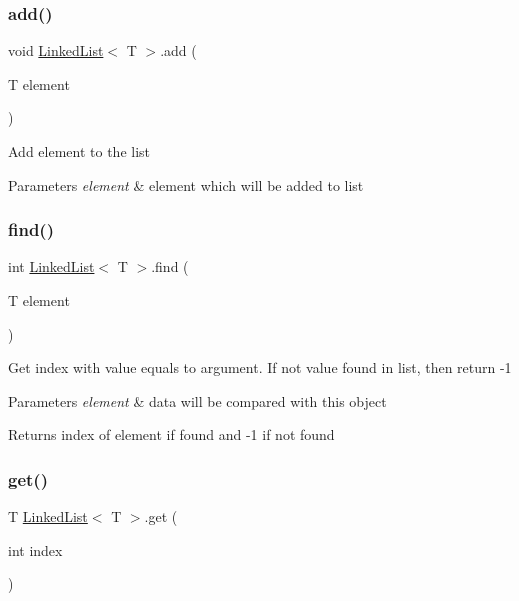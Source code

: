 \subsubsection{\texorpdfstring{add()}{add()}}
{\footnotesize\ttfamily void \mbox{\hyperlink{class_linked_list}{Linked\+List}}$<$ T $>$.add (\begin{DoxyParamCaption}\item[{T}]{element }\end{DoxyParamCaption})\hspace{0.3cm}{\ttfamily [inline]}}

Add element to the list 
\begin{DoxyParams}{Parameters}
{\em element} & element which will be added to list \\
\hline
\end{DoxyParams}
\mbox{\label{class_linked_list_abb5fc485a297b815daf6034f1c455979}} 
\subsubsection{\texorpdfstring{find()}{find()}}
{\footnotesize\ttfamily int \mbox{\hyperlink{class_linked_list}{Linked\+List}}$<$ T $>$.find (\begin{DoxyParamCaption}\item[{T}]{element }\end{DoxyParamCaption})\hspace{0.3cm}{\ttfamily [inline]}}

Get index with value equals to argument. If not value found in list, then return -\/1 
\begin{DoxyParams}{Parameters}
{\em element} & data will be compared with this object \\
\hline
\end{DoxyParams}
\begin{DoxyReturn}{Returns}
index of element if found and -\/1 if not found 
\end{DoxyReturn}
\mbox{\label{class_linked_list_a032ef46fc54f12525746d9f7c3a80663}} 
\subsubsection{\texorpdfstring{get()}{get()}}
{\footnotesize\ttfamily T \mbox{\hyperlink{class_linked_list}{Linked\+List}}$<$ T $>$.get (\begin{DoxyParamCaption}\item[{int}]{index }\end{DoxyParamCaption})\hspace{0.3cm}{\ttfamily [inline]}}

